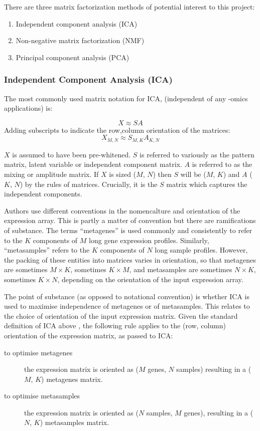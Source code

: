 \documentclass[draft, tikz, 12pt,a4paper,oneside,fleqn]{article}
\begin{document}
There are three matrix factorization methods of potential interest to this project:
\begin{enumerate}
\item Independent component analysis (ICA)
\item Non-negative matrix factorization (NMF)
\item Principal component analysis (PCA)
\end{enumerate}


\subsubsection{Independent Component Analysis (ICA)}

The most commonly used matrix notation for ICA, (independent of any -omics applications) is:

\begin{equation}
X \approx S A
\end{equation}
Adding subscripts to indicate the row,column orientation of the matrices:
\begin{equation}
X_{M,N} \approx S_{M,K} A_{K,N}
\end{equation}

$X$ is assumed to have been pre-whitened.  $S$ is referred to variously as the pattern matrix, latent variable or independent component matrix.  $A$ is referred to as the mixing or amplitude matrix.   If $X$ is sized ($M$, $N$) then $S$ will be ($M$, $K$) and $A$ ($K$, $N$) by the rules of matrices.  Crucially, it is the $S$ matrix which captures the independent components.

Authors use different conventions in the nomencalture and orientation of the expression array.  This is partly a matter of convention but there are ramifications of substance.   The terms ``metagenes'' is used commonly and consistently to refer to the $K$ components of $M$ long gene expression profiles.  Similarly, ``metasamples'' refers to the $K$ components of $N$ long sample profiles.   However, the packing of these entities into matrices varies in orientation, so that metagenes are sometimes $M \times K$, sometimes $K \times M$, and metasamples are sometimes $N \times K$, sometimes $K \times N$, depending on the orientation of the input expression array.

The point of substance (as opposed to notational convention) is whether ICA is used to maximise independence of metagenes or of metasamples.  This relates to the choice of orientation of the input expression matrix.  Given the standard definition of ICA above \cite{ICA_definition}, the following rule applies to the (row, column) orientation of the expression matrix, as passed to ICA:
\begin{description}
\item[to optimise metagenes] the expression matrix is oriented as ($M$ genes, $N$ samples) resulting in a ($M$, $K$) metagenes matrix. 
\item[to optimise metasamples] the expression matrix is oriented as ($N$ samples, $M$ genes), resulting in a ($N$, $K$) metasamples matrix.
\end{description}
\end{document}
